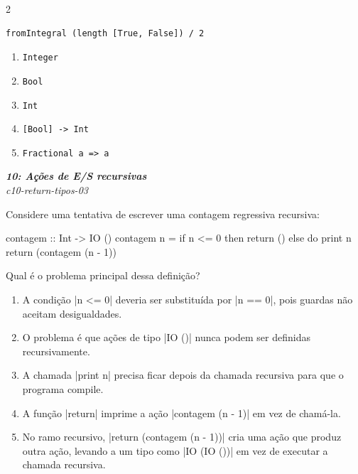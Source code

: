 \documentclass[a4paper,10pt,brazil]{article}
\begin{document}
\begin{multicols}{2}
\begin{verbatim}
fromIntegral (length [True, False]) / 2
\end{verbatim}

\begin{enumerate}
  \item \texttt{Integer}
  \item \texttt{Bool}
  \item \texttt{Int}
  \item \texttt{[Bool] -> Int}
  \item \texttt{Fractional a => a}

\end{enumerate}

\begin{flushright}
  \footnotesize
  \textit{\textbf{10: Ações de E/S recursivas}}\\
  \textit{c10-return-tipos-03}\\

\end{flushright}
Considere uma tentativa de escrever uma contagem regressiva recursiva:

\begin{haskellcode}
contagem :: Int -> IO ()
contagem n =
  if n <= 0
    then return ()
    else do
      print n
      return (contagem (n - 1))
\end{haskellcode}

Qual é o problema principal dessa definição?

\begin{enumerate}
  \item A condição \haskellinline|n <= 0| deveria ser substituída por \haskellinline|n == 0|, pois guardas não aceitam desigualdades.

  \item O problema é que ações de tipo \haskellinline|IO ()| nunca podem ser definidas recursivamente.

  \item A chamada \haskellinline|print n| precisa ficar depois da chamada recursiva para que o programa compile.

  \item A função \haskellinline|return| imprime a ação \haskellinline|contagem (n - 1)| em vez de chamá-la.

  \item No ramo recursivo, \haskellinline|return (contagem (n - 1))| cria uma ação que produz outra ação, levando a um tipo como \haskellinline|IO (IO ())| em vez de executar a chamada recursiva.



\end{enumerate}
\end{multicols}
\end{document}
